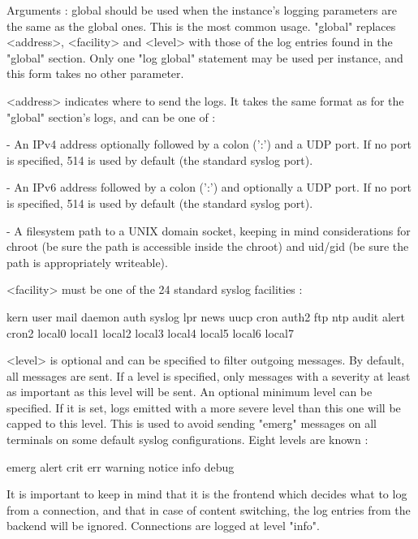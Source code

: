   Arguments :
    global     should be used when the instance's logging parameters are the
               same as the global ones. This is the most common usage. "global"
               replaces <address>, <facility> and <level> with those of the log
               entries found in the "global" section. Only one "log global"
               statement may be used per instance, and this form takes no other
               parameter.

    <address>  indicates where to send the logs. It takes the same format as
               for the "global" section's logs, and can be one of :

               - An IPv4 address optionally followed by a colon (':') and a UDP
                 port. If no port is specified, 514 is used by default (the
                 standard syslog port).

               - An IPv6 address followed by a colon (':') and optionally a UDP
                 port. If no port is specified, 514 is used by default (the
                 standard syslog port).

               - A filesystem path to a UNIX domain socket, keeping in mind
                 considerations for chroot (be sure the path is accessible
                 inside the chroot) and uid/gid (be sure the path is
                 appropriately writeable).

    <facility> must be one of the 24 standard syslog facilities :

                 kern   user   mail   daemon auth   syslog lpr    news
                 uucp   cron   auth2  ftp    ntp    audit  alert  cron2
                 local0 local1 local2 local3 local4 local5 local6 local7

    <level>    is optional and can be specified to filter outgoing messages. By
               default, all messages are sent. If a level is specified, only
               messages with a severity at least as important as this level
               will be sent. An optional minimum level can be specified. If it
               is set, logs emitted with a more severe level than this one will
               be capped to this level. This is used to avoid sending "emerg"
               messages on all terminals on some default syslog configurations.
               Eight levels are known :

                 emerg  alert  crit   err    warning notice info  debug

  It is important to keep in mind that it is the frontend which decides what to
  log from a connection, and that in case of content switching, the log entries
  from the backend will be ignored. Connections are logged at level "info".

